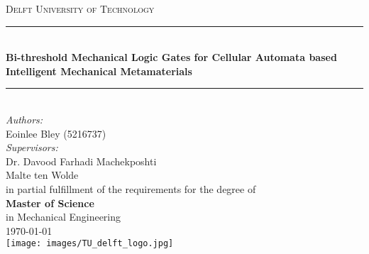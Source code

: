 \documentclass[a4paper]{article}
\begin{document}
\begin{titlepage}

\newcommand{\HRule}{\rule{\linewidth}{0.5mm}} 							%
\center 
 
\textsc{\LARGE Delft University of Technology}\\[1cm]

\HRule \\[0.8cm]
{ \huge \bfseries Bi-threshold Mechanical Logic Gates for Cellular Automata based Intelligent Mechanical Metamaterials }\\[0.7cm]								%
\HRule \\[1cm]
\large
\emph{Authors:}\\
Eoinlee Bley (5216737)\\[1.5cm]	
\emph{Supervisors:}\\
Dr. Davood Farhadi Machekposhti\\
Malte ten Wolde\\[0.5cm]
in partial fulfillment of the requirements for the degree of \\[0.5cm]
\textbf{Master of Science}\\
in Mechanical Engineering\\[0.5cm]
{\large \today}\\[5cm]
\texttt{[image: images/TU\_delft\_logo.jpg]}\\[1cm] 	%
\vfill 
\end{titlepage}

\begin{abstract}

\end{abstract}

\tableofcontents




\newpage



\end{document}
